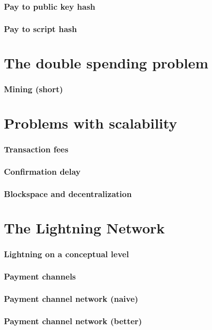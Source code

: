 \documentclass{beamer}
\begin{document}

\begin{frame}
\frametitle{Pay to public key hash}

\end{frame}

\begin{frame}
\frametitle{Pay to script hash}

\end{frame}
\section{The double spending problem}
\begin{frame}
\frametitle{Mining (short)}

\end{frame}
\section{Problems with scalability}
\begin{frame}
\frametitle{Transaction fees}

\end{frame}
\begin{frame}
\frametitle{Confirmation delay}

\end{frame}
\begin{frame}
\frametitle{Blockspace and decentralization}

\end{frame}
\section{The Lightning Network}
\begin{frame}
\frametitle{Lightning on a conceptual level}

\end{frame}
\begin{frame}
\frametitle{Payment channels}

\end{frame}
\begin{frame}
\frametitle{Payment channel network (naive)}

\end{frame}
\begin{frame}
\frametitle{Payment channel network (better)}

\end{frame}
\end{document}
